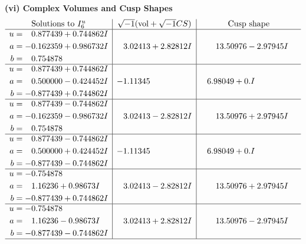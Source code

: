 \documentclass[1p]{elsarticle_modified}
\theoremstyle{definition}
\newcommand{\I}{\sqrt{-1}}
\begin{document}
\newpage\flushleft \textbf{(vi) Complex Volumes and Cusp Shapes}
$$\begin{array}{c|c|c}  
\text{Solutions to }I^u_{6}& \I (\text{vol} + \sqrt{-1}CS) & \text{Cusp shape}\\
 \hline 
\begin{aligned}
u &= \phantom{-}0.877439 + 0.744862 I \\
a &= -0.162359 + 0.986732 I \\
b &= \phantom{-}0.754878\phantom{ +0.000000I}\end{aligned}
 & \phantom{-}3.02413 + 2.82812 I & \phantom{-}13.50976 - 2.97945 I \\ \hline\begin{aligned}
u &= \phantom{-}0.877439 + 0.744862 I \\
a &= \phantom{-}0.500000 - 0.424452 I \\
b &= -0.877439 + 0.744862 I\end{aligned}
 & -1.11345\phantom{ +0.000000I} & \phantom{-}6.98049 + 0. I\phantom{ +0.000000I} \\ \hline\begin{aligned}
u &= \phantom{-}0.877439 - 0.744862 I \\
a &= -0.162359 - 0.986732 I \\
b &= \phantom{-}0.754878\phantom{ +0.000000I}\end{aligned}
 & \phantom{-}3.02413 - 2.82812 I & \phantom{-}13.50976 + 2.97945 I \\ \hline\begin{aligned}
u &= \phantom{-}0.877439 - 0.744862 I \\
a &= \phantom{-}0.500000 + 0.424452 I \\
b &= -0.877439 - 0.744862 I\end{aligned}
 & -1.11345\phantom{ +0.000000I} & \phantom{-}6.98049 + 0. I\phantom{ +0.000000I} \\ \hline\begin{aligned}
u &= -0.754878\phantom{ +0.000000I} \\
a &= \phantom{-}1.16236 + 0.98673 I \\
b &= -0.877439 + 0.744862 I\end{aligned}
 & \phantom{-}3.02413 - 2.82812 I & \phantom{-}13.50976 + 2.97945 I \\ \hline\begin{aligned}
u &= -0.754878\phantom{ +0.000000I} \\
a &= \phantom{-}1.16236 - 0.98673 I \\
b &= -0.877439 - 0.744862 I\end{aligned}
 & \phantom{-}3.02413 + 2.82812 I & \phantom{-}13.50976 - 2.97945 I\\
 \hline 
 \end{array}$$\newpage\newpage\renewcommand{\arraystretch}{1}
\end{document}
